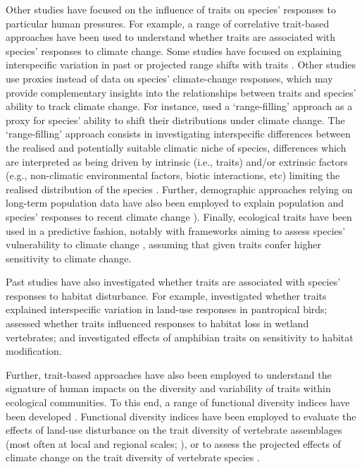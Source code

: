 Other studies have focused on the influence of traits on species' responses to particular human pressures. For example, a range of correlative trait-based approaches have been used to understand whether traits are associated with species' responses to climate change. Some studies have focused on explaining interspecific variation in past or projected range shifts with traits \citep{Schloss2012, Mccain2014, Pacifici2017, DiMarco2021}. Other studies use proxies instead of data on species' climate-change responses, which may provide complementary insights into the relationships between traits and species' ability to track climate change. For instance, \citet{Estrada2018} used a `range-filling' approach as a proxy for species' ability to shift their distributions under climate change. The `range-filling' approach consists in investigating interspecific differences between the realised and potentially suitable climatic niche of species, differences which are interpreted as being driven by intrinsic (i.e., traits) and/or extrinsic factors (e.g., non-climatic environmental factors, biotic interactions, etc) limiting the realised distribution of the species \citep{Estrada2018, Svenning2004}.
Further, demographic approaches relying on long-term population data have also been employed to explain population and species' responses to recent climate change \citep{Spooner2018, Capdevila2022a}). Finally, ecological traits have been used in a predictive fashion, notably with frameworks aiming to assess species' vulnerability to climate change \citep{Foden2013, Pacifici2015}, assuming that given traits confer higher sensitivity to climate change. 

Past studies have also investigated whether traits are associated with species' responses to habitat disturbance. For example, \citet{Newbold2013} investigated whether traits explained interspecific variation in land-use responses in pantropical birds; \citet{Quesnelle2014} assessed whether traits influenced responses to habitat loss in wetland vertebrates; and \citet{Nowakowski2017} investigated effects of amphibian traits on sensitivity to habitat modification.

Further, trait-based approaches have also been employed to understand the signature of human impacts on the diversity and variability of traits within ecological communities. To this end, a range of functional diversity indices have been developed \citep{Schleuter2010a, Legras2018}. Functional diversity indices have been employed to evaluate the effects of land-use disturbance on the trait diversity of vertebrate assemblages (most often at local and regional scales; \citet{Flynn2009, LaSorte2018, Tinoco2018}), or to assess the projected effects of climate change on the trait diversity of vertebrate species \citep{Stewart2022}.

